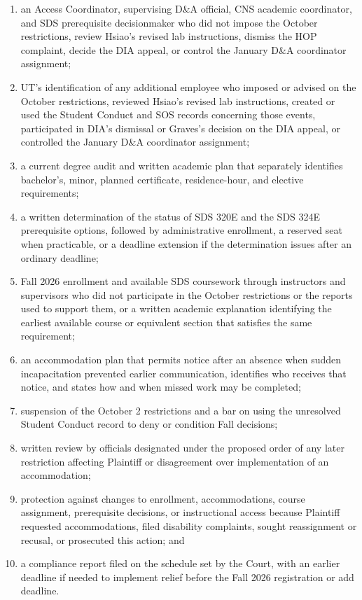 \documentclass[12pt]{article}
\begin{document}
\begin{enumerate}
\item an Access Coordinator, supervising D\&A official, CNS academic coordinator, and SDS prerequisite decisionmaker who did not impose the October restrictions, review Hsiao's revised lab instructions, dismiss the HOP complaint, decide the DIA appeal, or control the January D\&A coordinator assignment;
 
\item UT's identification of any additional employee who imposed or advised on the October restrictions, reviewed Hsiao's revised lab instructions, created or used the Student Conduct and SOS records concerning those events, participated in DIA's dismissal or Graves's decision on the DIA appeal, or controlled the January D\&A coordinator assignment;
 
\item a current degree audit and written academic plan that separately identifies bachelor's, minor, planned certificate, residence-hour, and elective requirements;
 
\item a written determination of the status of SDS 320E and the SDS 324E prerequisite options, followed by administrative enrollment, a reserved seat when practicable, or a deadline extension if the determination issues after an ordinary deadline;
 
\item Fall 2026 enrollment and available SDS coursework through instructors and supervisors who did not participate in the October restrictions or the reports used to support them, or a written academic explanation identifying the earliest available course or equivalent section that satisfies the same requirement;
 
\item an accommodation plan that permits notice after an absence when sudden incapacitation prevented earlier communication, identifies who receives that notice, and states how and when missed work may be completed;
 
\item suspension of the October 2 restrictions and a bar on using the unresolved Student Conduct record to deny or condition Fall decisions;
 
\item written review by officials designated under the proposed order of any later restriction affecting Plaintiff or disagreement over implementation of an accommodation;
 
\item protection against changes to enrollment, accommodations, course assignment, prerequisite decisions, or instructional access because Plaintiff requested accommodations, filed disability complaints, sought reassignment or recusal, or prosecuted this action; and
 
\item a compliance report filed on the schedule set by the Court, with an earlier deadline if needed to implement relief before the Fall 2026 registration or add deadline.
\end{enumerate}
 
\end{document}
